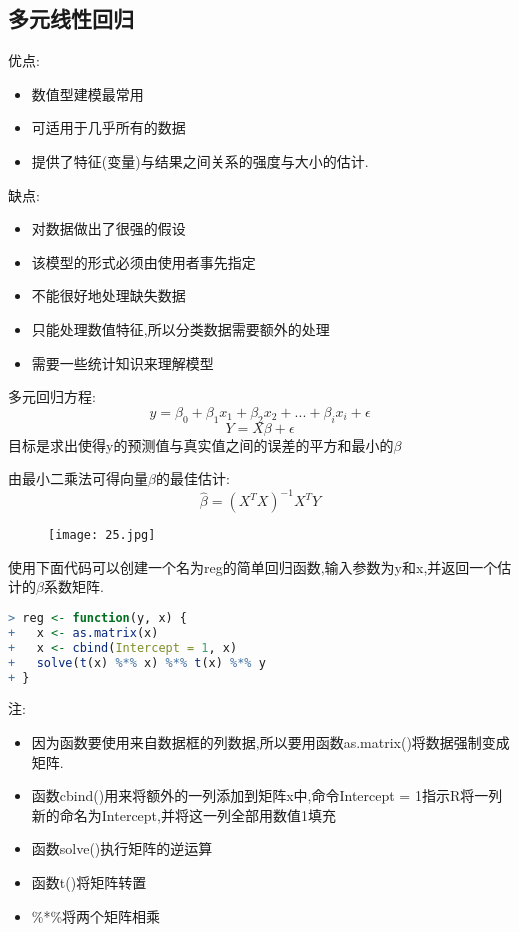 \documentclass[11pt,a4paper,oneside]{book}
\begin{document}
\subsection{多元线性回归}
\begin{tcolorbox}[colback=pink!10!white,colframe=pink!100!black]
优点:
\begin{itemize}
	\item 数值型建模最常用
	\item 可适用于几乎所有的数据
	\item 提供了特征(变量)与结果之间关系的强度与大小的估计.
\end{itemize}
缺点:
\begin{itemize}
	\item 对数据做出了很强的假设
	\item 该模型的形式必须由使用者事先指定
	\item 不能很好地处理缺失数据
	\item 只能处理数值特征,所以分类数据需要额外的处理
	\item 需要一些统计知识来理解模型
\end{itemize}
\end{tcolorbox}

多元回归方程:
\begin{equation}
y=\beta_0+\beta_1 x_1+\beta_2 x_2+...+\beta_i x_i+\epsilon
\end{equation}
\begin{equation}
Y=X\beta+\epsilon
\end{equation}
目标是求出使得y的预测值与真实值之间的误差的平方和最小的$\beta$

由最小二乘法可得向量$\beta$的最佳估计:
\begin{equation}
\hat{\beta}=(X^TX)^{-1}X^TY
\end{equation}
\begin{figure}[H]
	\centering
	\texttt{[image: 25.jpg]}
\end{figure}

使用下面代码可以创建一个名为reg的简单回归函数,输入参数为y和x,并返回一个估计的$\beta$系数矩阵.
\begin{lstlisting}[language=r]
> reg <- function(y, x) {
+   x <- as.matrix(x)
+   x <- cbind(Intercept = 1, x)
+   solve(t(x) %*% x) %*% t(x) %*% y
+ }
\end{lstlisting}
\begin{tcolorbox}[colback=pink!10!white,colframe=pink!100!black]
注:
\begin{itemize}
	\item 因为函数要使用来自数据框的列数据,所以要用函数as.matrix()将数据强制变成矩阵.
	\item 函数cbind()用来将额外的一列添加到矩阵x中,命令Intercept = 1指示R将一列新的命名为Intercept,并将这一列全部用数值1填充
	\item 函数solve()执行矩阵的逆运算
	\item 函数t()将矩阵转置
	\item \%*\%将两个矩阵相乘
\end{itemize}
\end{tcolorbox}
\end{document}
